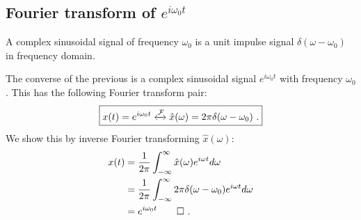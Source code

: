 \subsection{Fourier transform of $e^{i\omega_0 t}$}


\begin{marginfigure}
\begin{center}


\end{center}
\caption{A complex sinusoidal signal of frequency $\omega_0$ is a unit impulse signal $\delta(\omega-\omega_0)$ in frequency domain.}
\end{marginfigure}

The converse of the previous is a complex sinusoidal signal $e^{i\omega_0 t}$ with frequency $\omega_0$. This has the following Fourier transform pair:
\begin{equation}
\boxed{
x(t) = e^{i\omega_0 t} \xleftrightarrow{\mathcal{F}} \hat{x}(\omega) = 2\pi \delta(\omega-\omega_0)\,\,.
}
\end{equation}
We show this by inverse Fourier transforming $\hat{x}(\omega)$:
\begin{align}
x(t) &= \frac{1}{2\pi}\int_{-\infty}^{\infty} \hat{x}(\omega) e^{i\omega t} d\omega \\
 &= \frac{1}{2\pi}\int_{-\infty}^{\infty} 2\pi \delta(\omega-\omega_0)e^{i\omega t} d\omega \\
 &= e^{i\omega_0 t}\qed\,\,.
\end{align}

